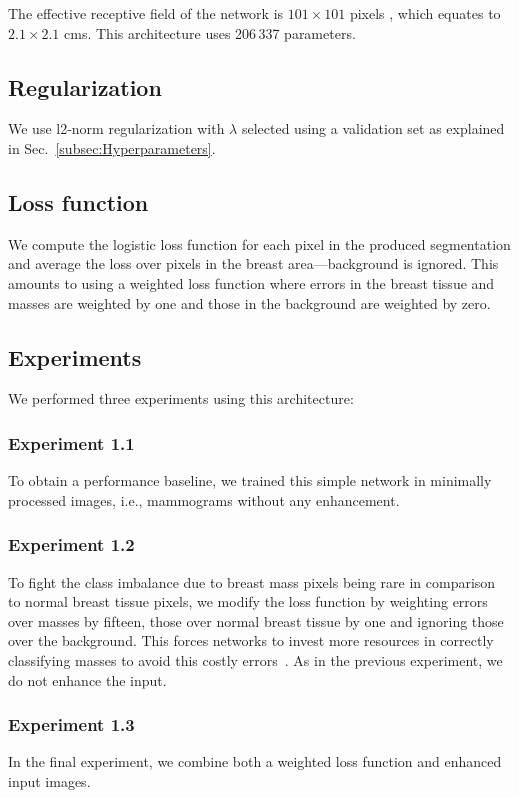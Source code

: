 The effective receptive field of the network is $101 \times 101$ pixels , which equates to $2.1 \times 2.1$ cms. This architecture uses 206\,337 parameters. %

\subsection{Regularization}
We use l2-norm regularization with $\lambda$ selected using a validation set as explained in Sec.~\ref{subsec:Hyperparameters}.

\subsection{Loss function}
We compute the logistic loss function for each pixel in the produced segmentation and average the loss over pixels in the breast area---background is ignored. This amounts to using a weighted loss function where errors in the breast tissue and masses are weighted by one and those in the background are weighted by zero.

\subsection{Experiments}
We performed three experiments using this architecture:
\subsubsection{Experiment 1.1} 
To obtain a performance baseline, we trained this simple network in minimally processed images, i.e., mammograms without any enhancement.

\subsubsection{Experiment 1.2} 
\label{subsec:Experiment1_2}
To fight the class imbalance due to breast mass pixels being rare in comparison to normal breast tissue pixels, we modify the loss function by weighting errors over masses by fifteen, those over normal breast tissue by one and ignoring those over the background. This forces networks to invest more resources in correctly classifying masses to avoid this costly errors~\cite{Provost2000}. As in the previous experiment, we do not enhance the input.

\subsubsection{Experiment 1.3}
In the final experiment, we combine both a weighted loss function and enhanced input images.
